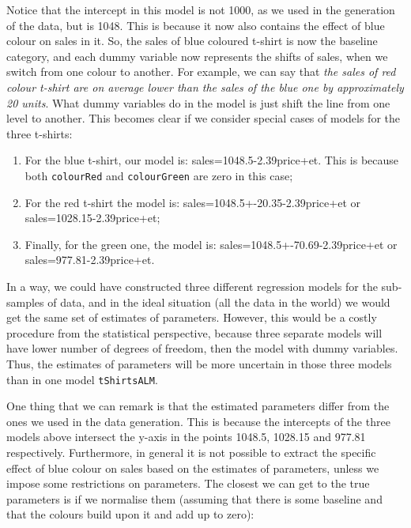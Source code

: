 \documentclass[
]{book}
\providecommand{\tightlist}{%
  \setlength{\itemsep}{0pt}\setlength{\parskip}{0pt}}
\theoremstyle{definition}
\theoremstyle{definition}
\theoremstyle{definition}
\theoremstyle{definition}
\theoremstyle{remark}
\begin{document}
Notice that the intercept in this model is not 1000, as we used in the generation of the data, but is 1048. This is because it now also contains the effect of blue colour on sales in it. So, the sales of blue coloured t-shirt is now the baseline category, and each dummy variable now represents the shifts of sales, when we switch from one colour to another. For example, we can say that \emph{the sales of red colour t-shirt are on average lower than the sales of the blue one by approximately 20 units}. What dummy variables do in the model is just shift the line from one level to another. This becomes clear if we consider special cases of models for the three t-shirts:

\begin{enumerate}
\def\labelenumi{\arabic{enumi}.}
\tightlist
\item
  For the blue t-shirt, our model is: sales=1048.5-2.39price+et. This is because both \texttt{colourRed} and \texttt{colourGreen} are zero in this case;
\item
  For the red t-shirt the model is: sales=1048.5+-20.35-2.39price+et or sales=1028.15-2.39price+et;
\item
  Finally, for the green one, the model is: sales=1048.5+-70.69-2.39price+et or sales=977.81-2.39price+et.
\end{enumerate}

In a way, we could have constructed three different regression models for the sub-samples of data, and in the ideal situation (all the data in the world) we would get the same set of estimates of parameters. However, this would be a costly procedure from the statistical perspective, because three separate models will have lower number of degrees of freedom, then the model with dummy variables. Thus, the estimates of parameters will be more uncertain in those three models than in one model \texttt{tShirtsALM}.

One thing that we can remark is that the estimated parameters differ from the ones we used in the data generation. This is because the intercepts of the three models above intersect the y-axis in the points 1048.5, 1028.15 and 977.81 respectively. Furthermore, in general it is not possible to extract the specific effect of blue colour on sales based on the estimates of parameters, unless we impose some restrictions on parameters. The closest we can get to the true parameters is if we normalise them (assuming that there is some baseline and that the colours build upon it and add up to zero):
\end{document}
